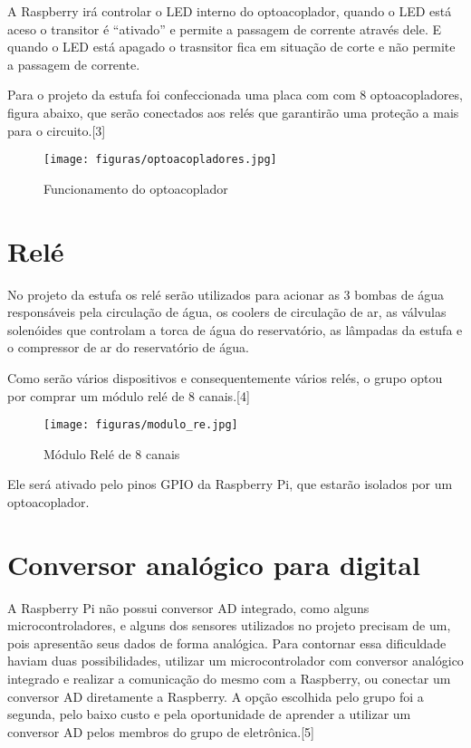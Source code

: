 A Raspberry irá controlar o LED interno do optoacoplador, quando o LED está aceso o transitor é “ativado” e permite a passagem de corrente através dele. E quando o LED está apagado o trasnsitor fica em situação de corte e não permite a passagem de corrente.

Para o projeto da estufa foi confeccionada uma placa com com 8 optoacopladores, figura abaixo, que serão conectados aos relés que garantirão uma proteção a mais para o circuito\cite{vishay}.[3]

\begin{figure}[H]
	\centering
	\texttt{[image: figuras/optoacopladores.jpg]}
	\caption{Funcionamento do optoacoplador} \label{optoacopladores}
\end{figure}

\section{Relé}

No projeto da estufa os relé serão utilizados para acionar as 3 bombas de água responsáveis pela circulação de água, os coolers de circulação de ar, as válvulas solenóides que controlam a torca de água do reservatório, as lâmpadas da estufa e o compressor de ar do reservatório de água.

Como serão vários dispositivos e consequentemente vários relés, o grupo optou por comprar um módulo relé de 8 canais\cite{braga2012}.[4]

\begin{figure}[H]
	\centering
	\texttt{[image: figuras/modulo\_re.jpg]}
	\caption{Módulo Relé de 8 canais} \label{modulo_re}
\end{figure}

Ele será ativado pelo pinos GPIO da Raspberry Pi, que estarão isolados por um optoacoplador.

\section{Conversor analógico para digital}

A Raspberry Pi não possui conversor AD integrado, como alguns microcontroladores, e alguns dos sensores utilizados no projeto precisam de um, pois apresentão seus dados de forma analógica. Para contornar essa dificuldade haviam duas possibilidades, utilizar um microcontrolador com conversor analógico integrado e realizar a comunicação do mesmo com a Raspberry, ou conectar um conversor AD diretamente a Raspberry. A opção escolhida pelo grupo foi a segunda, pelo baixo custo e pela oportunidade de aprender a utilizar um conversor AD pelos membros do grupo de eletrônica\cite{nxp2013}.[5]
 
